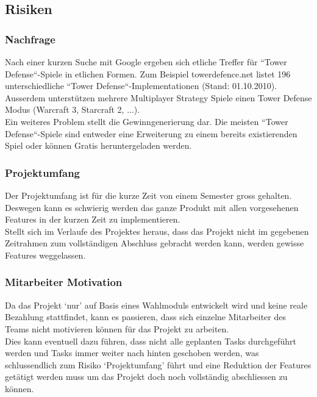 \subsection{Risiken} \label{sec:Risiken}
\subsubsection{Nachfrage} \label{subsec:Risiken-Nachfrage}
Nach einer kurzen Suche mit Google ergeben sich etliche Treffer für ``Tower Defense``-Spiele in etlichen Formen. Zum Beispiel towerdefence.net listet 196 unterschiedliche ``Tower Defense``-Implementationen (Stand: 01.10.2010). Ausserdem unterstützen mehrere Multiplayer Strategy Spiele einen Tower Defense Modus (Warcraft 3, Starcraft 2, ...). \\
Ein weiteres Problem stellt die Gewinngenerierung dar. Die meisten ``Tower Defense``-Spiele sind entweder eine Erweiterung zu einem bereits existierenden Spiel oder können Gratis heruntergeladen werden.

\subsubsection{Projektumfang} \label{subsec:Risiken-Projektumfang}
Der Projektumfang ist für die kurze Zeit von einem Semester gross gehalten. Deswegen kann es schwierig werden das ganze Produkt mit allen vorgesehenen Features in der kurzen Zeit zu implementieren. \\
Stellt sich im Verlaufe des Projektes heraus, dass das Projekt nicht im gegebenen Zeitrahmen zum vollständigen Abschluss gebracht werden kann, werden gewisse Features weggelassen.

\subsubsection{Mitarbeiter Motivation} \label{subsec:Mitarbeiter-Motivation}
Da das Projekt `nur' auf Basis eines Wahlmoduls entwickelt wird und keine reale Bezahlung stattfindet, kann es passieren, dass sich einzelne Mitarbeiter des Teams nicht motivieren können für das Projekt zu arbeiten. \\
Dies kann eventuell dazu führen, dass nicht alle geplanten Tasks durchgeführt werden und Tasks immer weiter nach hinten geschoben werden, was schlussendlich zum Risiko `Projektumfang' führt und eine Reduktion der Features getätigt werden muss um das Projekt doch noch vollständig abschliessen zu können.

